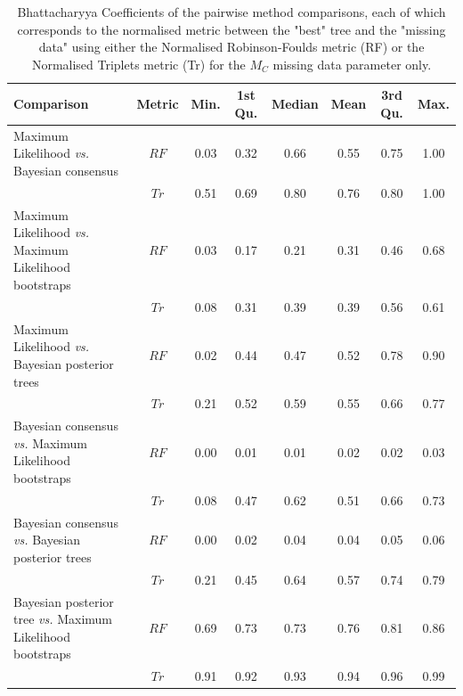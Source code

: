 \documentclass[12pt,letterpaper]{article}
\begin{document}
\begin{landscape}
\begin{table}[ht]
\caption{Bhattacharyya Coefficients of the pairwise method comparisons, each of which corresponds to the normalised metric between the "best" tree and the "missing data" using either the Normalised Robinson-Foulds metric (RF) or the Normalised Triplets metric (Tr) for the $M_{C}$ missing data parameter only.}
\label{Tab_Supp_summary_BC_MC}
\centering
\begin{tabular}{lccccccc}
  \hline
 Comparison &  Metric & Min. & 1st Qu. & Median & Mean & 3rd Qu. & Max. \\  
  \hline
    Maximum Likelihood \textit{vs.} Bayesian consensus                 & $RF$ & 0.03 & 0.32 & 0.66 & 0.55 & 0.75 & 1.00 \\ 
                                                                       & $Tr$ & 0.51 & 0.69 & 0.80 & 0.76 & 0.80 & 1.00 \\ 
    Maximum Likelihood \textit{vs.} Maximum Likelihood bootstraps      & $RF$ & 0.03 & 0.17 & 0.21 & 0.31 & 0.46 & 0.68 \\ 
                                                                       & $Tr$ & 0.08 & 0.31 & 0.39 & 0.39 & 0.56 & 0.61 \\ 
    Maximum Likelihood \textit{vs.} Bayesian posterior trees           & $RF$ & 0.02 & 0.44 & 0.47 & 0.52 & 0.78 & 0.90 \\ 
                                                                       & $Tr$ & 0.21 & 0.52 & 0.59 & 0.55 & 0.66 & 0.77 \\ 
    Bayesian consensus \textit{vs.} Maximum Likelihood bootstraps      & $RF$ & 0.00 & 0.01 & 0.01 & 0.02 & 0.02 & 0.03 \\ 
                                                                       & $Tr$ & 0.08 & 0.47 & 0.62 & 0.51 & 0.66 & 0.73 \\ 
    Bayesian consensus \textit{vs.} Bayesian posterior trees           & $RF$ & 0.00 & 0.02 & 0.04 & 0.04 & 0.05 & 0.06 \\ 
                                                                       & $Tr$ & 0.21 & 0.45 & 0.64 & 0.57 & 0.74 & 0.79 \\ 
    Bayesian posterior tree \textit{vs.} Maximum Likelihood bootstraps & $RF$ & 0.69 & 0.73 & 0.73 & 0.76 & 0.81 & 0.86 \\ 
                                                                       & $Tr$ & 0.91 & 0.92 & 0.93 & 0.94 & 0.96 & 0.99 \\ 
   \hline
\end{tabular}
\end{table}
\end{landscape}
\end{document}
